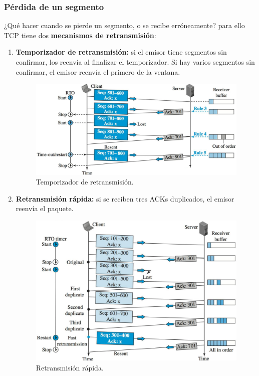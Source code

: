\subsubsection{Pérdida de un segmento}
¿Qué hacer cuando se pierde un segmento, o se recibe erróneamente? para ello TCP tiene dos \textbf{mecanismos de retransmisión}:
\begin{enumerate}
    \item \textbf{Temporizador de retransmisión:} si el emisor tiene segmentos sin confirmar, los reenvía al finalizar el temporizador. Si hay varios segmentos sin confirmar, el emisor reenvía el primero de la ventana.
        \begin{figure}[H]\centering
        \includegraphics[width=\textwidth]{img/TCPTdRet.png}
        \caption{Temporizador de retransmisión.}\end{figure}
    \item \textbf{Retransmisión rápida:} si se reciben tres ACKs duplicados, el emisor reenvía el paquete.
        \begin{figure}[H] \centering
        \includegraphics[width=\textwidth]{img/TCPRetRap.png}
        \caption{Retransmisión rápida.}\end{figure}
\end{enumerate}
\newpage
